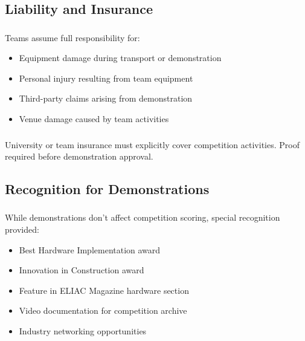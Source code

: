 \subsection{Liability and Insurance}

\subsubsection{}
Teams assume full responsibility for:
\begin{itemize}[noitemsep]
    \item Equipment damage during transport or demonstration
    \item Personal injury resulting from team equipment
    \item Third-party claims arising from demonstration
    \item Venue damage caused by team activities
\end{itemize}

\subsubsection{}
University or team insurance must explicitly cover competition activities. Proof required before demonstration approval.

\subsection{Recognition for Demonstrations}

\subsubsection{}
While demonstrations don't affect competition scoring, special recognition provided:
\begin{itemize}[noitemsep]
    \item Best Hardware Implementation award
    \item Innovation in Construction award
    \item Feature in ELIAC Magazine hardware section
    \item Video documentation for competition archive
    \item Industry networking opportunities
\end{itemize}